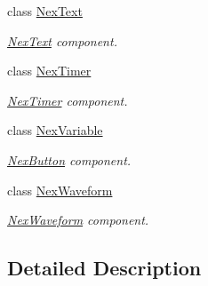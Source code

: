 \begin{DoxyCompactItemize}
class \hyperlink{class_nex_text}{Nex\+Text}
\begin{DoxyCompactList}\small\item\em \hyperlink{class_nex_text}{Nex\+Text} component. \end{DoxyCompactList}\item 
class \hyperlink{class_nex_timer}{Nex\+Timer}
\begin{DoxyCompactList}\small\item\em \hyperlink{class_nex_timer}{Nex\+Timer} component. \end{DoxyCompactList}\item 
class \hyperlink{class_nex_variable}{Nex\+Variable}
\begin{DoxyCompactList}\small\item\em \hyperlink{class_nex_button}{Nex\+Button} component. \end{DoxyCompactList}\item 
class \hyperlink{class_nex_waveform}{Nex\+Waveform}
\begin{DoxyCompactList}\small\item\em \hyperlink{class_nex_waveform}{Nex\+Waveform} component. \end{DoxyCompactList}\end{DoxyCompactItemize}


\subsection{Detailed Description}
